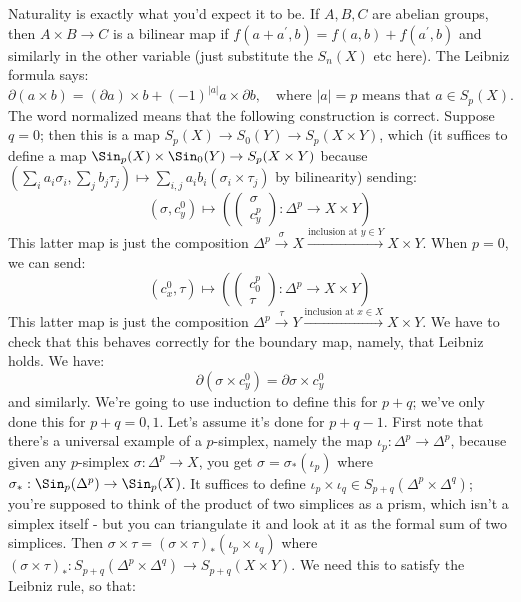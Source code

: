 Naturality is exactly what you'd expect it to be. If $A,B,C$ are abelian groups, then $A\times B\to C$ is a bilinear map if $f(a+a^\prime,b)=f(a,b)+f(a^\prime,b)$ and similarly in the other variable (just substitute the $S_n(X)$ etc here). The Leibniz formula says:
		\begin{equation*}
		\partial(a\times b) = (\partial a)\times b + (-1)^{|a|}a\times\partial b,\quad\text{where }|a|=p\text{ means that }a\in S_p(X).
		\end{equation*}
The word normalized means that the following construction is correct. Suppose $q=0$; then this is a map $S_p(X)\to S_0(Y)\to S_p(X\times Y)$, which (it suffices to define a map $\Sin_p(X)\times \Sin_0(Y)\to S_p(X\times Y)$ because $\left(\sum_i a_i\sigma_i,\sum_j b_j\tau_j\right)\mapsto \sum_{i,j}a_ib_i(\sigma_i\times\tau_j)$ by bilinearity) sending:
		\begin{equation*}
		(\sigma, c^0_y)\mapsto \left(\begin{pmatrix}\sigma \\ c^p_y\end{pmatrix}:\Delta^p\to X\times Y\right)
		\end{equation*}
This latter map is just the composition $\Delta^p\xrightarrow{\sigma} X\xrightarrow{\text{inclusion at }y\in Y}X\times Y$. When $p=0$, we can send:
		\begin{equation*}
		(c^0_x,\tau)\mapsto \left(\begin{pmatrix}c^p_0 \\ \tau\end{pmatrix}:\Delta^p\to X\times Y\right)
		\end{equation*}
This latter map is just the composition $\Delta^p\xrightarrow{\tau} Y\xrightarrow{\text{inclusion at }x\in X}X\times Y$. We have to check that this behaves correctly for the boundary map, namely, that Leibniz holds. We have:
		\begin{equation*}
		\partial(\sigma\times c^0_y) = \partial\sigma\times c^0_y
		\end{equation*}
and similarly. We're going to use induction to define this for $p+q$; we've only done this for $p+q=0,1$. Let's assume it's done for $p+q-1$. First note that there's a universal example of a $p$-simplex, namely the map $\iota_p:\Delta^p\to \Delta^p$, because given any $p$-simplex $\sigma:\Delta^p\to X$, you get $\sigma=\sigma_\ast(\iota_p)$ where $\sigma_\ast:\Sin_p(\Delta^p)\to \Sin_p(X)$. It suffices to define $\iota_p\times\iota_q\in S_{p+q}(\Delta^p\times\Delta^q)$; you're supposed to think of the product of two simplices as a prism, which isn't a simplex itself - but you can triangulate it and look at it as the formal sum of two simplices. Then $\sigma\times \tau = (\sigma\times\tau)_\ast(\iota_p\times\iota_q)$ where $(\sigma\times\tau)_\ast:S_{p+q}(\Delta^p\times\Delta^q)\to S_{p+q}(X\times Y)$. We need this to satisfy the Leibniz rule, so that:
